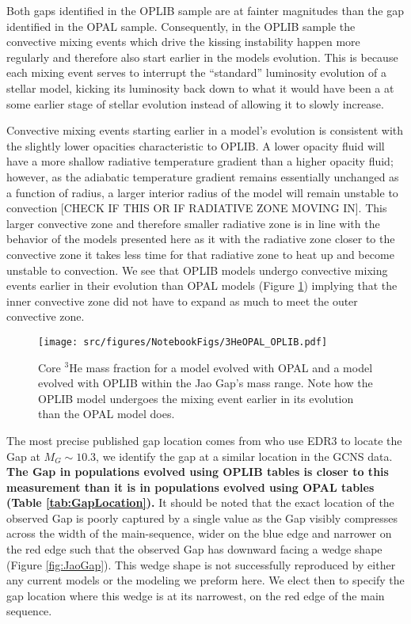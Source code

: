 Both gaps identified in the OPLIB sample are at fainter magnitudes than the gap
identified in the OPAL sample. Consequently, in the OPLIB sample the
convective mixing events which drive the kissing instability happen more
regularly and therefore also start earlier in the models evolution. This is
because each mixing event serves to interrupt the ``standard'' luminosity
evolution of a stellar model, kicking its luminosity back down to what it would
have been a at some earlier stage of stellar evolution instead of allowing it
to slowly increase.

Convective mixing events starting earlier in a model's evolution is consistent
with the slightly lower opacities characteristic to OPLIB. A lower opacity
fluid will have a more shallow radiative temperature gradient than a higher
opacity fluid; however, as the adiabatic temperature gradient remains
essentially unchanged as a function of radius, a larger interior radius of the
model will remain unstable to convection {\color{red}[CHECK IF THIS OR IF
RADIATIVE ZONE MOVING IN]}. This larger convective zone and therefore smaller
radiative zone is in line with the behavior of the models presented here as it
with the radiative zone closer to the convective zone it takes less time for
that radiative zone to heat up and become unstable to convection. We see that
OPLIB models undergo convective mixing events earlier in their evolution than
OPAL models (Figure \ref{fig:OPALOPLIB3He}) implying that the inner convective
zone did not have to expand as much to meet the outer convective zone. 

\begin{figure}
	\centering
	\texttt{[image: src/figures/NotebookFigs/3HeOPAL\_OPLIB.pdf]}
	\caption{Core $^{3}$He mass fraction for a model evolved with OPAL and a
	model evolved with OPLIB within the Jao Gap's mass range. Note how the
	OPLIB model undergoes the mixing event earlier in its evolution than the
	OPAL model does.}
	\label{fig:OPALOPLIB3He}
\end{figure}

The most precise published gap location comes from \citet{Jao2020} who use EDR3
to locate the Gap at $M_{G} \sim 10.3$, we identify the gap at a similar
location in the GCNS data. \textbf{The Gap in populations evolved using OPLIB tables
is closer to this measurement than it is in populations evolved using OPAL tables
(Table \ref{tab:GapLocation}).} It should be noted that the exact location of
the observed Gap is poorly captured by a single value as the Gap visibly
compresses across the width of the main-sequence, wider on the blue edge and
narrower on the red edge such that the observed Gap has downward facing a wedge
shape (Figure \ref{fig:JaoGap}). This wedge shape is not successfully
reproduced by either any current models or the modeling we preform here. We
elect then to specify the gap location where this wedge is at its narrowest, on
the red edge of the main sequence.

